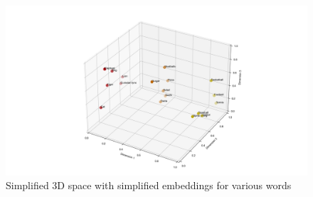 \begin{figure}[H]
    \centering
    \includegraphics[width=\textwidth]{content/figures/assets/04-background-word-plot.png}
    \caption{Simplified 3D space with simplified embeddings for various words}
    \label{fig:background_word_plot}
\end{figure}
